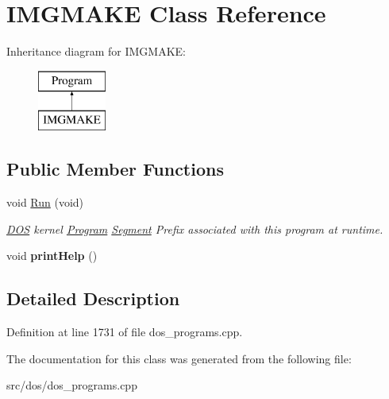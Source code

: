 \hypertarget{classIMGMAKE}{\section{I\-M\-G\-M\-A\-K\-E Class Reference}
\label{classIMGMAKE}
}
Inheritance diagram for I\-M\-G\-M\-A\-K\-E\-:\begin{figure}[H]
\begin{center}
\leavevmode
\includegraphics[height=2.000000cm]{classIMGMAKE}
\end{center}
\end{figure}
\subsection*{Public Member Functions}
\begin{DoxyCompactItemize}
\item 
\hypertarget{classIMGMAKE_afbd2116356dab83d08b978c72ee74340}{void \hyperlink{classIMGMAKE_afbd2116356dab83d08b978c72ee74340}{Run} (void)}\label{classIMGMAKE_afbd2116356dab83d08b978c72ee74340}

\begin{DoxyCompactList}\small\item\em \hyperlink{classDOS}{D\-O\-S} kernel \hyperlink{classProgram}{Program} \hyperlink{structSegment}{Segment} Prefix associated with this program at runtime. \end{DoxyCompactList}\item 
\hypertarget{classIMGMAKE_aed2e86f96068d3380ddc72eb78377938}{void {\bfseries print\-Help} ()}\label{classIMGMAKE_aed2e86f96068d3380ddc72eb78377938}

\end{DoxyCompactItemize}


\subsection{Detailed Description}


Definition at line 1731 of file dos\-\_\-programs.\-cpp.



The documentation for this class was generated from the following file\-:\begin{DoxyCompactItemize}
\item 
src/dos/dos\-\_\-programs.\-cpp\end{DoxyCompactItemize}
